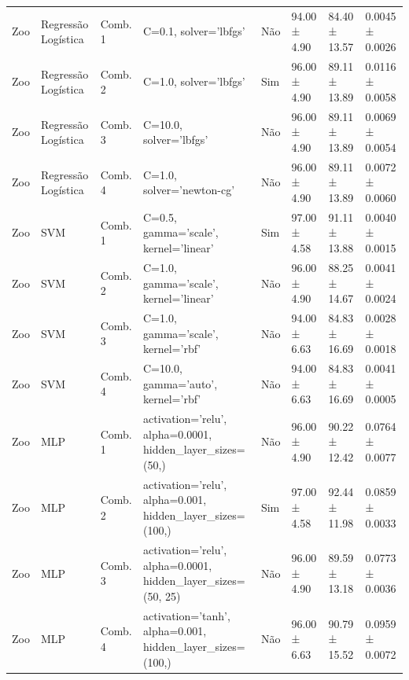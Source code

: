 \begin{longtable}{llllllll}
Zoo & Regressão Logística & Comb. 1 & C=0.1, solver='lbfgs' & Não & 94.00 ± 4.90 & 84.40 ± 13.57 & 0.0045 ± 0.0026 \\
Zoo & Regressão Logística & Comb. 2 & C=1.0, solver='lbfgs' & Sim & 96.00 ± 4.90 & 89.11 ± 13.89 & 0.0116 ± 0.0058 \\
Zoo & Regressão Logística & Comb. 3 & C=10.0, solver='lbfgs' & Não & 96.00 ± 4.90 & 89.11 ± 13.89 & 0.0069 ± 0.0054 \\
Zoo & Regressão Logística & Comb. 4 & C=1.0, solver='newton-cg' & Não & 96.00 ± 4.90 & 89.11 ± 13.89 & 0.0072 ± 0.0060 \\
Zoo & SVM & Comb. 1 & C=0.5, gamma='scale', kernel='linear' & Sim & 97.00 ± 4.58 & 91.11 ± 13.88 & 0.0040 ± 0.0015 \\
Zoo & SVM & Comb. 2 & C=1.0, gamma='scale', kernel='linear' & Não & 96.00 ± 4.90 & 88.25 ± 14.67 & 0.0041 ± 0.0024 \\
Zoo & SVM & Comb. 3 & C=1.0, gamma='scale', kernel='rbf' & Não & 94.00 ± 6.63 & 84.83 ± 16.69 & 0.0028 ± 0.0018 \\
Zoo & SVM & Comb. 4 & C=10.0, gamma='auto', kernel='rbf' & Não & 94.00 ± 6.63 & 84.83 ± 16.69 & 0.0041 ± 0.0005 \\
Zoo & MLP & Comb. 1 & activation='relu', alpha=0.0001, hidden\_layer\_sizes=(50,) & Não & 96.00 ± 4.90 & 90.22 ± 12.42 & 0.0764 ± 0.0077 \\
Zoo & MLP & Comb. 2 & activation='relu', alpha=0.001, hidden\_layer\_sizes=(100,) & Sim & 97.00 ± 4.58 & 92.44 ± 11.98 & 0.0859 ± 0.0033 \\
Zoo & MLP & Comb. 3 & activation='relu', alpha=0.0001, hidden\_layer\_sizes=(50, 25) & Não & 96.00 ± 4.90 & 89.59 ± 13.18 & 0.0773 ± 0.0036 \\
Zoo & MLP & Comb. 4 & activation='tanh', alpha=0.001, hidden\_layer\_sizes=(100,) & Não & 96.00 ± 6.63 & 90.79 ± 15.52 & 0.0959 ± 0.0072 \\
\end{longtable}
